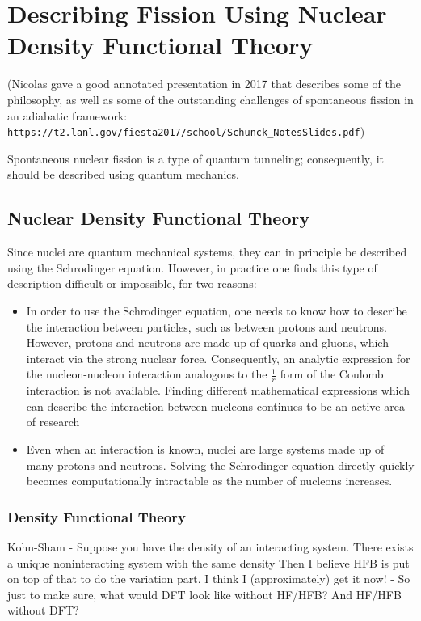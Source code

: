 \chapter{Describing Fission Using Nuclear Density Functional Theory}\label{chap:Model}
\maketitle

(Nicolas gave a good annotated presentation in 2017 that describes some of the philosophy, as well as some of the outstanding challenges of spontaneous fission in an adiabatic framework: \verb|https://t2.lanl.gov/fiesta2017/school/Schunck_NotesSlides.pdf|)

Spontaneous nuclear fission is a type of quantum tunneling; consequently, it should be described using quantum mechanics.

\section{Nuclear Density Functional Theory}
Since nuclei are quantum mechanical systems, they can in principle be described using the Schrodinger equation. However, in practice one finds this type of description difficult or impossible, for two reasons:

\begin{itemize}
\item In order to use the Schrodinger equation, one needs to know how to describe the interaction between particles, such as between protons and neutrons. However, protons and neutrons are made up of quarks and gluons, which interact via the strong nuclear force. Consequently, an analytic expression for the nucleon-nucleon interaction analogous to the $\frac{1}{r}$ form of the Coulomb interaction is not available. Finding different mathematical expressions which can describe the interaction between nucleons continues to be an active area of research \cite{lots of papers}
\item Even when an interaction is known, nuclei are large systems made up of many protons and neutrons. Solving the Schrodinger equation directly quickly becomes computationally intractable as the number of nucleons increases.
\end{itemize}


\subsection{Density Functional Theory}\label{sect:DFT}
Kohn-Sham - Suppose you have the density of an interacting system. There exists a unique noninteracting system with the same density
Then I believe HFB is put on top of that to do the variation part. I think I (approximately) get it now! - So just to make sure, what would DFT look like without HF/HFB? And HF/HFB without DFT?

